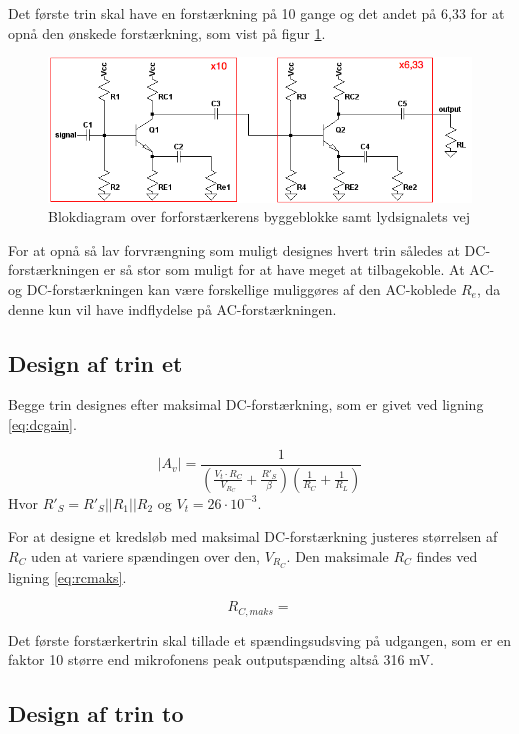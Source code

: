 Det første trin skal have en forstærkning på 10 gange og det andet på 6,33 for at opnå den ønskede forstærkning, som vist på figur \ref{blok_forforstaerker}.

\begin{figure}[h]
\centering
\includegraphics[scale=.6]{teknisk/forforstaerker/blok_forforstaerker.png}
\caption{Blokdiagram over forforstærkerens byggeblokke samt lydsignalets vej}
\label{blok_forforstaerker}
\end{figure}

For at opnå så lav forvrængning som muligt designes hvert trin således at DC-forstærkningen er så stor som muligt for at have meget at tilbagekoble. At AC- og DC-forstærkningen kan være forskellige muliggøres af den AC-koblede $R_e$, da denne kun vil have indflydelse på AC-forstærkningen.

\subsection*{Design af trin et}
Begge trin designes efter maksimal DC-forstærkning, som er givet ved ligning \ref{eq:dcgain}.

\begin{equation}
|A_{v}|=\frac{1}{\left(\frac{V_t \cdot R_C}{V_{R_C}}+\frac{R'_S}{\beta}\right) \left(\frac{1}{R_C}+\frac{1}{R_L}\right)}
\label{eq:dcgain}
\end{equation}
Hvor $R'_S = R'_S||R_1||R_2$ og $V_t = 26 \cdot 10^{-3}$.

For at designe et kredsløb med maksimal DC-forstærkning justeres størrelsen af $R_C$ uden at variere spændingen over den, $V_{R_C}$. Den maksimale $R_C$ findes ved ligning \ref{eq:rcmaks}.

\begin{equation}
R_{C,maks} = 
\end{equation}

Det første forstærkertrin skal tillade et spændingsudsving på udgangen, som er en faktor 10 større end mikrofonens peak outputspænding altså 316 mV. 


\subsection*{Design af trin to}



